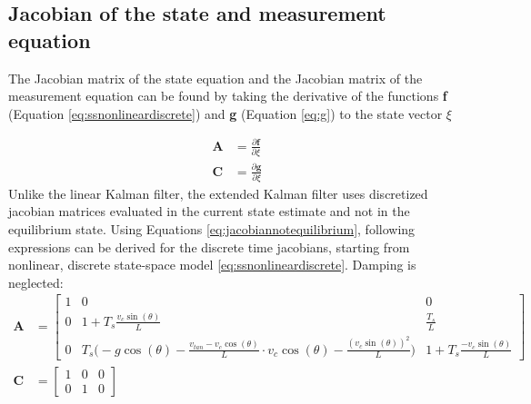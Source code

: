 \documentclass[a4paper,kul]{kulakarticle} %
\begin{document}
\subsection{Jacobian of the state and measurement equation}
The Jacobian matrix of the state equation and the Jacobian matrix of the measurement equation can be found by taking the derivative of the functions \textbf{f} (Equation \ref{eq:ssnonlineardiscrete}) and \textbf{g} (Equation \ref{eq:g}) to the state vector $\xi$

\begin{equation}
\begin{split}
\mathbf{A} &= \frac{\partial \mathbf{f}}{\partial \xi}\\
\mathbf{C} &= \frac{\partial \mathbf{g}}{\partial \xi}
\end{split}	
\label{eq:jacobiannotequilibrium}
\end{equation}
Unlike the linear Kalman filter, the extended Kalman filter uses discretized jacobian matrices evaluated in the current state estimate and not in the equilibrium state. Using Equations \ref{eq:jacobiannotequilibrium}, following expressions can be derived for the discrete time jacobians, starting from nonlinear, discrete state-space model \ref{eq:ssnonlineardiscrete}. Damping is neglected: 
\begin{equation}
\begin{split}
\mathbf{A} &= \begin{bmatrix}
1&0&0\\0&1+T_s\frac{v_c\sin(\theta)}{L}&\frac{T_s}{L}\\0&T_s\bigg(-g\cos(\theta) - \frac{v_{tan}-v_c\cos(\theta)}{L} \cdot v_c \cos(\theta)-\frac{(v_c\sin(\theta))^2}{L}\bigg)&1+T_s\frac{-v_c\sin(\theta)}{L}
\end{bmatrix}\\
\mathbf{C} &= \begin{bmatrix}
1&0&0\\0&1&0
\end{bmatrix}
\end{split}
\end{equation}
\end{document}
